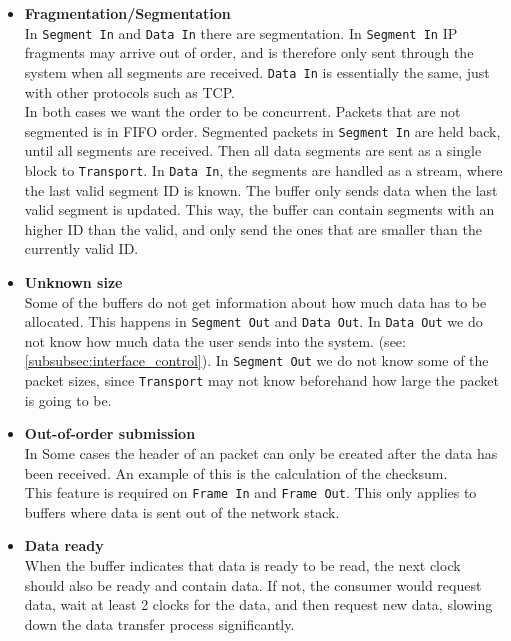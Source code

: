 \begin{itemize}
    \item \textbf{Fragmentation/Segmentation}\\
    In \texttt{Segment In} and \texttt{Data In} there are segmentation. In
    \texttt{Segment In} IP fragments may arrive out of order, and is therefore only
    sent through the system when all segments are received. \texttt{Data In} is
    essentially the same, just with other protocols such as TCP.\\
    In both cases we want the order to be concurrent. Packets that are not
    segmented is in FIFO order. Segmented packets in \texttt{Segment In} are
    held back, until all segments are received. Then all data segments are sent
    as a single block to \texttt{Transport}. In \texttt{Data In}, the segments are
    handled as a stream, where the last valid segment ID is known. The buffer
    only sends data when the last valid segment is updated. This way, the buffer
    can contain segments with an higher ID than the valid, and only send the ones
    that are smaller than the currently valid ID.


    \item \textbf{Unknown size}\\
    Some of the buffers do not get information about how much data has to be
    allocated. This happens in \texttt{Segment Out} and \texttt{Data Out}.
    In \texttt{Data Out} we do not know how much data the user sends into
    the system. (see: \autoref{subsubsec:interface_control}). In
    \texttt{Segment Out} we do not know some of the packet sizes, since
    \texttt{Transport} may not know beforehand how large the packet is going to
    be.

    \item \textbf{Out-of-order submission}\\
    In Some cases the header of an packet can only be created after the data
    has been received. An example of this is the calculation of the checksum.\\
    This feature is required on \texttt{Frame In} and \texttt{Frame Out}.
    This only applies to buffers where data is sent out of the network stack.

    \item \textbf{Data ready}\\
    When the buffer indicates that data is ready to be read, the next clock
    should also be ready and contain data. If not, the consumer would request
    data, wait at least 2 clocks for the data, and then request new data,
    slowing down the data transfer process significantly.

\end{itemize}
